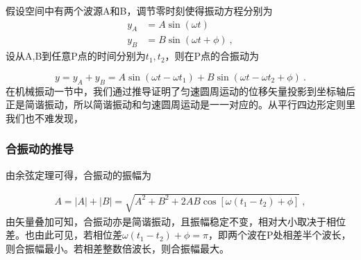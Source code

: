 假设空间中有两个波源A和B，调节零时刻使得振动方程分别为
\begin{equation}
\begin{aligned}
y_A&=A\sin(\omega t)\\
y_B&=B\sin (\omega t+\phi)~,
\end{aligned}
\end{equation}
设从A,B到任意P点的时间分别为$t_1,t_2$，则在P点的合振动为

\begin{equation}
y=y_A+y_B=A\sin(\omega t-\omega t_1)+B\sin(\omega t-\omega t_2+\phi)~.
\end{equation}
在机械振动一节中，我们通过推导证明了匀速圆周运动的位移矢量投影到坐标轴后正是简谐振动，所以简谐振动和匀速圆周运动是一一对应的。从平行四边形定则里我们也不难发现，

\subsubsection{合振动的推导}
由余弦定理可得，合振动的振幅为

\begin{equation}
\begin{aligned}
A=|A|+|B|=\sqrt{A^2+B^2+2AB\cos[\omega(t_1-t_2)+\phi]}~,
\end{aligned}
\end{equation}
由矢量叠加可知，合振动亦是简谐振动，且振幅稳定不变，相对大小取决于相位差。也由此可见，若相位差$\omega(t_1-t_2)+\phi=\pi$，即两个波在P处相差半个波长，则合振幅最小。若相差整数倍波长，则合振幅最大。
